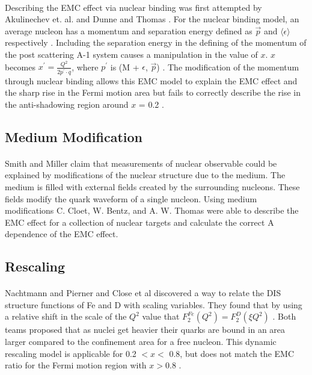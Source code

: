 \paragraph{} Describing the EMC effect via nuclear binding was first attempted by Akulinechev et. al. \cite{EMC_binding_3} and Dunne and Thomas \cite{EMC_binding_2}. For the nuclear binding model, an average nucleon has a momentum and separation energy defined as $\vec{p}$ and $\langle \epsilon \rangle$ respectively \cite{Norton}. Including the separation energy in the defining of the momentum of the post scattering A-1 system causes a manipulation in the value of $x$. $x$ becomes $x^{\prime} = \frac{Q^2}{2p^{\prime}\cdot q}$, where $p^{\prime}$ is (M + $\epsilon$, $\vec{p}$) \cite{Norton}. The modification of the momentum through nuclear binding allows this EMC model to explain the EMC effect and the sharp rise in the Fermi motion area but fails to correctly describe the rise in the anti-shadowing region around $x$ = 0.2 \cite{EMC_binding, EMC_model_1, Ajth}.

\subsection{Medium Modification}
\paragraph{} Smith and Miller \cite{EMC_medium_2} claim that measurements of nuclear observable could be explained by modifications of the nuclear structure due to the medium. The medium is filled with external fields created by the surrounding nucleons. These fields modify the quark waveform of a single nucleon. Using medium modifications C. Cloet, W. Bentz, and A. W. Thomas \cite{EMC_medium_1} were able to describe the EMC effect for a collection of nuclear targets and calculate the correct A dependence of the EMC effect. 


\subsection{Rescaling}
\paragraph{} Nachtmann and Pierner \cite{EMC_rescaling_2} and Close et al \cite{EMC_rescaling_1} discovered a way to relate the DIS structure functions of Fe and D with scaling variables. They found that by using a relative shift in the scale of the $Q^2$ value that $F_2^{Fe}(Q^2) =F_2^{D}(\xi Q^2)$ \cite{Geesaman}. Both teams proposed that as nuclei get heavier their quarks are bound in an area larger compared to the confinement area for a free nucleon. This dynamic rescaling model is applicable for 0.2 $ < x <$ 0.8, but does not match the EMC ratio for the Fermi motion region with $x > 0.8$ \cite{EMC_model_1, EMC_rescaling_1, Geesaman, EMC_rescaling_2}.

